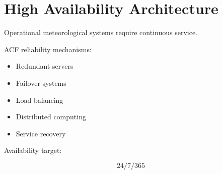 \section{High Availability Architecture}


Operational meteorological systems require continuous service.



ACF reliability mechanisms:


\begin{itemize}

\item Redundant servers

\item Failover systems

\item Load balancing

\item Distributed computing

\item Service recovery

\end{itemize}



Availability target:


\[
24/7/365
\]
